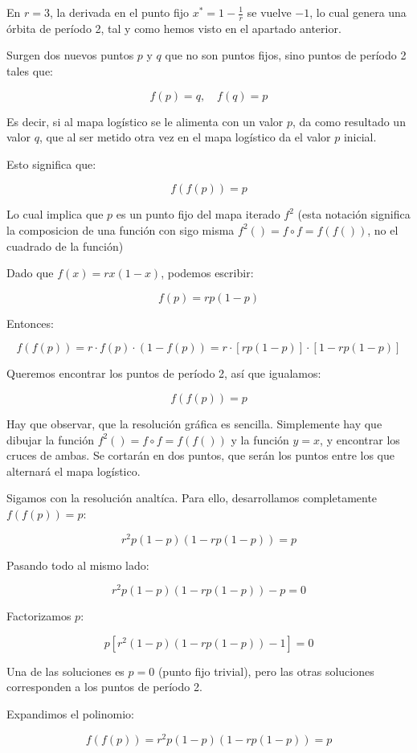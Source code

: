 \documentclass[
  11pt,
  a4paper,
  DIV=11,
  numbers=noendperiod]{scrreprt}
\begin{document}
En \(r = 3\), la derivada en el punto fijo \(x^* = 1 - \frac{1}{r}\) se
vuelve \(-1\), lo cual genera una órbita de período 2, tal y como hemos
visto en el apartado anterior.

Surgen dos nuevos puntos \(p\) y \(q\) que no son puntos fijos, sino
puntos de período 2 tales que:

\[
f(p) = q, \quad f(q) = p
\]

Es decir, si al mapa logístico se le alimenta con un valor \(p\), da
como resultado un valor \(q\), que al ser metido otra vez en el mapa
logístico da el valor \(p\) inicial.

Esto significa que:

\[
f(f(p)) = p
\]

Lo cual implica que \(p\) es un punto fijo del mapa iterado \(f^2\)
(esta notación significa la composicion de una función con sigo misma
\(f^2()=f \circ f = f(f())\), no el cuadrado de la función)

Dado que \(f(x) = r x (1 - x)\), podemos escribir:

\[
f(p) = r p (1 - p)
\]

Entonces:

\[
f(f(p)) = r \cdot f(p) \cdot (1 - f(p)) = r \cdot [r p (1 - p)] \cdot \left[1 - r p (1 - p)\right]
\]

Queremos encontrar los puntos de período 2, así que igualamos:

\[
f(f(p)) = p
\]

Hay que observar, que la resolución gráfica es sencilla. Simplemente hay
que dibujar la función \(f^2()=f \circ f = f(f())\) y la función
\(y=x\), y encontrar los cruces de ambas. Se cortarán en dos puntos, que
serán los puntos entre los que alternará el mapa logístico.

Sigamos con la resolución analtíca. Para ello, desarrollamos
completamente \(f(f(p)) = p\):

\[
r^2 p (1 - p)(1 - r p (1 - p)) = p
\]

Pasando todo al mismo lado:

\[
r^2 p (1 - p)(1 - r p (1 - p)) - p = 0
\]

Factorizamos \(p\):

\[
p \left[ r^2 (1 - p)(1 - r p (1 - p)) - 1 \right] = 0
\]

Una de las soluciones es \(p = 0\) (punto fijo trivial), pero las otras
soluciones corresponden a los puntos de período 2.

Expandimos el polinomio:

\[
f(f(p)) = r^2 p (1 - p)(1 - r p (1 - p)) = p
\]
\end{document}

